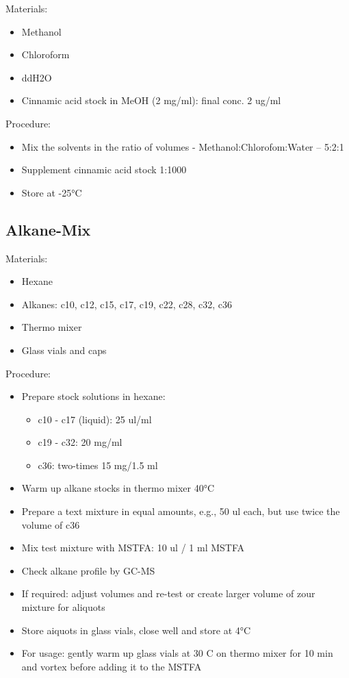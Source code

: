 \documentclass[]{book}
\providecommand{\tightlist}{%
  \setlength{\itemsep}{0pt}\setlength{\parskip}{0pt}}
\begin{document}
Materials:

\begin{itemize}
\tightlist
\item
  Methanol
\item
  Chloroform
\item
  ddH2O
\item
  Cinnamic acid stock in MeOH (2 mg/ml): final conc. 2 ug/ml
\end{itemize}

Procedure:

\begin{itemize}
\tightlist
\item
  Mix the solvents in the ratio of volumes - Methanol:Chlorofom:Water -- 5:2:1
\item
  Supplement cinnamic acid stock 1:1000
\item
  Store at -25°C
\end{itemize}

\hypertarget{alkanemix}{%
\subsection{Alkane-Mix}\label{alkanemix}}

Materials:

\begin{itemize}
\tightlist
\item
  Hexane
\item
  Alkanes: c10, c12, c15, c17, c19, c22, c28, c32, c36
\item
  Thermo mixer
\item
  Glass vials and caps
\end{itemize}

Procedure:

\begin{itemize}
\tightlist
\item
  Prepare stock solutions in hexane:

  \begin{itemize}
  \tightlist
  \item
    c10 - c17 (liquid): 25 ul/ml
  \item
    c19 - c32: 20 mg/ml
  \item
    c36: two-times 15 mg/1.5 ml
  \end{itemize}
\item
  Warm up alkane stocks in thermo mixer 40°C
\item
  Prepare a text mixture in equal amounts, e.g., 50 ul each, but use twice the volume of c36
\item
  Mix test mixture with MSTFA: 10 ul / 1 ml MSTFA
\item
  Check alkane profile by GC-MS
\item
  If required: adjust volumes and re-test or create larger volume of zour mixture for aliquots
\item
  Store aiquots in glass vials, close well and store at 4°C
\item
  For usage: gently warm up glass vials at 30 C on thermo mixer for 10 min and vortex before adding it to the MSTFA
\end{itemize}
\end{document}
